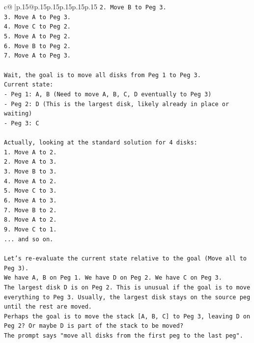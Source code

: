 \documentclass{article}
\begin{document}
{\begin{supertabular}{c@{$\;$}|p{.15\linewidth}@{}p{.15\linewidth}p{.15\linewidth}p{.15\linewidth}p{.15\linewidth}p{.15\linewidth}}
{{{\texttt{2. Move B to Peg 3.} \\
\texttt{3. Move A to Peg 3.} \\
\texttt{4. Move C to Peg 2.} \\
\texttt{5. Move A to Peg 2.} \\
\texttt{6. Move B to Peg 2.} \\
\texttt{7. Move A to Peg 3.} \\
\\ 
\texttt{Wait, the goal is to move all disks from Peg 1 to Peg 3.} \\
\texttt{Current state:} \\
\texttt{{-} Peg 1: A, B (Need to move A, B, C, D eventually to Peg 3)} \\
\texttt{{-} Peg 2: D (This is the largest disk, likely already in place or waiting)} \\
\texttt{{-} Peg 3: C} \\
\\ 
\texttt{Actually, looking at the standard solution for 4 disks:} \\
\texttt{1. Move A to 2.} \\
\texttt{2. Move A to 3.} \\
\texttt{3. Move B to 3.} \\
\texttt{4. Move A to 2.} \\
\texttt{5. Move C to 3.} \\
\texttt{6. Move A to 3.} \\
\texttt{7. Move B to 2.} \\
\texttt{8. Move A to 2.} \\
\texttt{9. Move C to 1.} \\
\texttt{... and so on.} \\
\\ 
\texttt{Let's re{-}evaluate the current state relative to the goal (Move all to Peg 3).} \\
\texttt{We have A, B on Peg 1. We have D on Peg 2. We have C on Peg 3.} \\
\texttt{The largest disk D is on Peg 2. This is unusual if the goal is to move everything to Peg 3. Usually, the largest disk stays on the source peg until the rest are moved.} \\
\texttt{Perhaps the goal is to move the stack {[}A, B, C{]} to Peg 3, leaving D on Peg 2? Or maybe D is part of the stack to be moved?} \\
\texttt{The prompt says "move all disks from the first peg to the last peg".} \\
}}}
\end{supertabular}}
\end{document}
